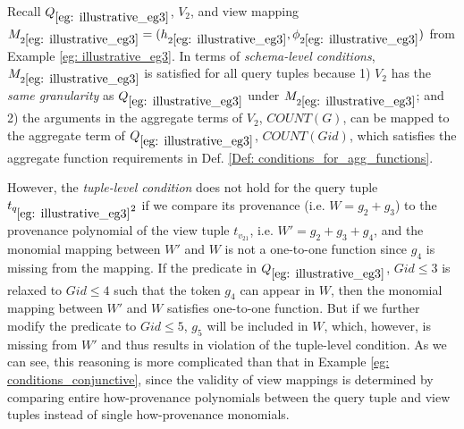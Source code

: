 \begin{example}
Recall $Q_{\ref{eg: illustrative_eg3}}$, $V_2$, and view mapping $M_{2\ref{eg: illustrative_eg3}}=(h_{2\ref{eg: illustrative_eg3}},\phi_{2\ref{eg: illustrative_eg3}})$ from Example \ref{eg: illustrative_eg3}. In terms of {\em schema-level conditions}, $M_{2\ref{eg: illustrative_eg3}}$ is satisfied for all query tuples because 1) $V_2$ has the {\em same granularity} as $Q_{\ref{eg: illustrative_eg3}}$ under $M_{2\ref{eg: illustrative_eg3}}$; and 2) the arguments in the aggregate terms of $V_2$, $COUNT(G)$, can be mapped to the aggregate term of $Q_{\ref{eg: illustrative_eg3}}$, $COUNT(Gid)$, which satisfies the aggregate function requirements in Def. \ref{Def: conditions_for_agg_functions}.

However, the {\em tuple-level condition} does not hold for the query tuple $t_{q_{\ref{eg: illustrative_eg3}}2}$ if we compare its provenance (i.e. $W = g_2 + g_3$) to the provenance polynomial of the view tuple $t_{v_21}$, i.e.
$W' = g_2 + g_3 + g_4$, and the monomial mapping between $W'$ and $W$ is not a one-to-one function since $g_4$ is missing from the mapping. If the predicate in $Q_{\ref{eg: illustrative_eg3}}$, $Gid \leq 3$ is relaxed to $Gid \leq 4$ such that the token $g_4$ can appear in $W$, then the monomial mapping between $W'$ and $W$ satisfies one-to-one function. But if we further modify the predicate to $Gid \leq 5$, $g_5$ will be included in $W$, which, however, is missing from $W'$ and thus results in violation of the tuple-level condition. As we can see, this reasoning is more complicated than that in Example \ref{eg: conditions_conjunctive}, since the validity of view mappings is determined by comparing entire how-provenance polynomials between the query tuple and view tuples instead of single how-provenance monomials.



\end{example}
